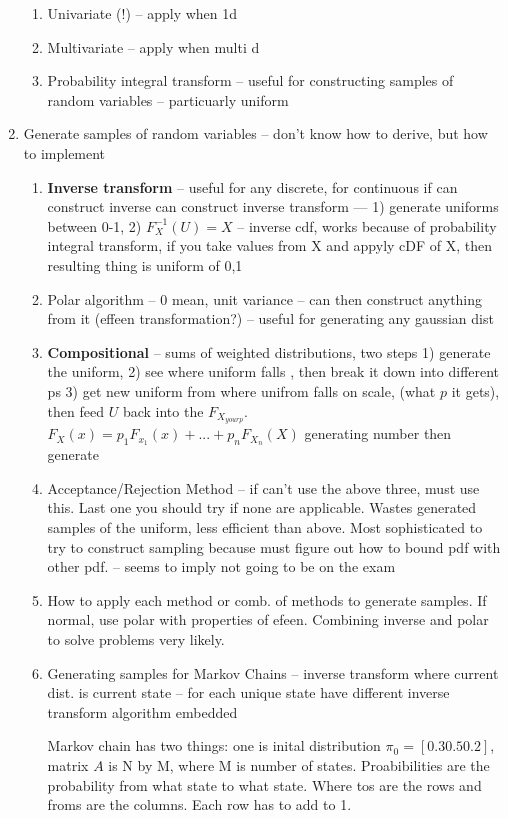 \documentclass{report}
\begin{document}
\begin{enumerate}
  \begin{enumerate}
 \item Univariate (!) -- apply when 1d
 \item Multivariate  -- apply when multi d
 \item Probability integral transform -- useful for constructing samples of random variables -- particuarly uniform
 \end{enumerate}
 \item Generate samples of random variables -- don't know how to derive, but how to implement
  \begin{enumerate}
 \item \textbf{Inverse transform} -- useful for any discrete, for continuous if can construct inverse can construct inverse transform --- 1) generate uniforms between 0-1, 2) $F_X^{-1}(U)=X$ -- inverse cdf, works because of probability integral transform, if you take values from X and appyly cDF of X, then resulting thing is uniform of 0,1
 \item Polar algorithm -- 0 mean, unit variance -- can then construct anything from it (effeen transformation?) -- useful for generating any gaussian dist
\item \textbf{Compositional} -- sums of weighted distributions, two steps 1) generate the uniform, 2) see where uniform falls , then break it down into different ps 3) get new uniform from where unifrom falls on scale, (what $p$ it gets), then feed $U$ back into the $F_{X_{your p}}$. $F_X(x) = p_1 F_{x_1}(x) + ... + p_n F_{X_n}(X)$ generating number then generate 
 \item Acceptance/Rejection Method -- if can't use the above three, must use this. Last one you should try if none are applicable. Wastes generated samples of the uniform, less efficient than above. Most sophisticated to try to construct sampling because must figure out how to bound pdf with other pdf. -- seems to imply not going to be on the exam
 \item How to apply each method or comb. of methods to generate samples. If normal, use polar with properties of efeen. Combining inverse and polar to solve problems very likely.
 \item Generating samples for Markov Chains -- inverse transform where current dist. is current state -- for each unique state have different inverse transform algorithm embedded 
 
Markov chain has two things: one is inital distribution $\pi_0 = [0.3 0.5 0.2]$, matrix $A$ is N by M, where M is number of states. Proabibilities are the probability from what state to what state. Where tos are the rows and froms are the columns. Each row has to add to 1. 



\end{enumerate}
\end{enumerate}
\end{document}
